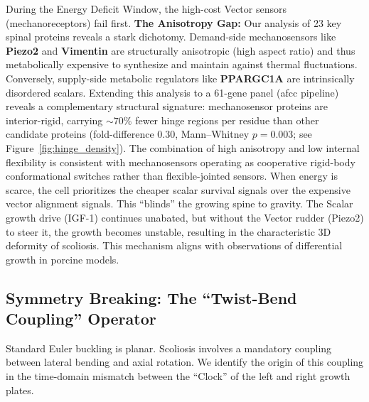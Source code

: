 During the Energy Deficit Window, the high-cost Vector sensors (mechanoreceptors) fail first.
\textbf{The Anisotropy Gap:} Our analysis of 23 key spinal proteins reveals a stark dichotomy. Demand-side mechanosensors like \textbf{Piezo2} and \textbf{Vimentin} are structurally anisotropic (high aspect ratio) and thus metabolically expensive to synthesize and maintain against thermal fluctuations. Conversely, supply-side metabolic regulators like \textbf{PPARGC1A} are intrinsically disordered scalars. Extending this analysis to a 61-gene panel (afcc pipeline) reveals a complementary structural signature: mechanosensor proteins are interior-rigid, carrying $\sim 70\%$ fewer hinge regions per residue than other candidate proteins (fold-difference $0.30$, Mann--Whitney $p = 0.003$; see Figure~\ref{fig:hinge_density}). The combination of high anisotropy and low internal flexibility is consistent with mechanosensors operating as cooperative rigid-body conformational switches rather than flexible-jointed sensors.
When energy is scarce, the cell prioritizes the cheaper scalar survival signals over the expensive vector alignment signals. This ``blinds'' the growing spine to gravity. The Scalar growth drive (IGF-1) continues unabated, but without the Vector rudder (Piezo2) to steer it, the growth becomes unstable, resulting in the characteristic 3D deformity of scoliosis. This mechanism aligns with observations of differential growth in porcine models.

\subsection{Symmetry Breaking: The ``Twist-Bend Coupling'' Operator}

Standard Euler buckling is planar. Scoliosis involves a mandatory coupling between lateral bending and axial rotation. We identify the origin of this coupling in the time-domain mismatch between the ``Clock'' of the left and right growth plates.

